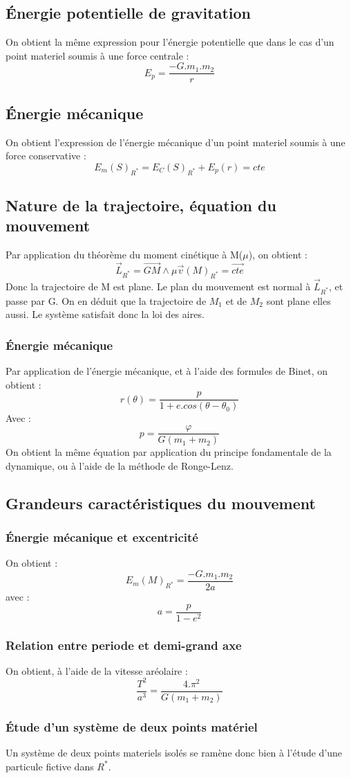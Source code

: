 \subsection{Énergie potentielle de gravitation}
On obtient la même expression pour l'énergie potentielle que dans le cas d'un point materiel soumis à une force centrale : 
$$E_p = \dfrac{-G.m_1.m_2}{r}$$
\subsection{Énergie mécanique}
On obtient l'expression de l'énergie mécanique d'un point materiel soumis à une force conservative : 
$$E_m(S)_{R^*} = E_C(S)_{R^*} + E_p(r) = cte$$
\subsection{Nature de la trajectoire, équation du mouvement}
Par application du théorème du moment cinétique à M($\mu$), on obtient :
$$\overrightarrow{L}_{R^*} = \overrightarrow{GM}\wedge\mu \overrightarrow{v}(M)_{R^*} = \overrightarrow{cte}$$
Donc la trajectoire de M est plane. Le plan du mouvement est normal à $\overrightarrow{L}_{R^*}$, et passe par G. On en déduit que la trajectoire de $M_1$ et de $M_2$ sont plane elles aussi. Le système satisfait donc la loi des aires.
\subsubsection{Énergie mécanique}
Par application de l'énergie mécanique, et à l'aide des formules de Binet, on obtient : 
$$r(\theta) = \dfrac{p}{1 + e.cos(\theta - \theta_0)}$$
Avec :
$$p = \dfrac{\varphi}{G(m_1+m_2)}$$
On obtient la même équation par application du principe fondamentale de la dynamique, ou à l'aide de la méthode de Ronge-Lenz.
\subsection{Grandeurs caractéristiques du mouvement}
\subsubsection{Énergie mécanique et excentricité}
On obtient : 
$$E_m(M)_{R^*} = \dfrac{-G.m_1.m_2}{2a}$$
avec : 
$$a = \dfrac{p}{1-e^2}$$
\subsubsection{Relation entre periode et demi-grand axe}
On obtient, à l'aide de la vitesse aréolaire : 
$$\dfrac{T^2}{a^3} = \dfrac{4.\pi^2}{G(m_1+m_2)}$$
\subsubsection{Étude d'un système de deux points matériel}
Un système de deux points materiels isolés se ramène donc bien à l'étude d'une particule fictive dans $R^*$. 
